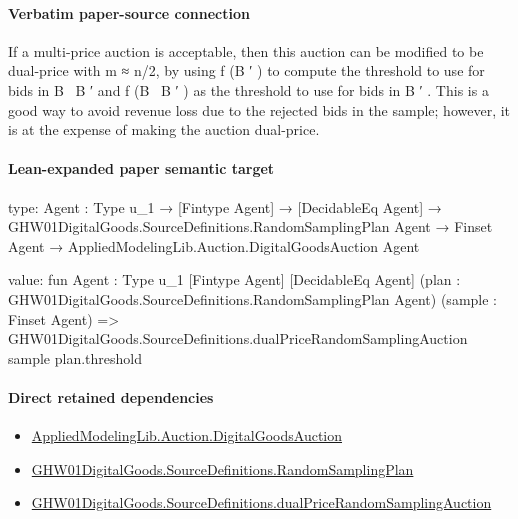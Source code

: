 \documentclass[10pt]{article}
\begin{document}
\paragraph{Verbatim paper-source connection}
\begin{ReviewVerbatim}
If a multi-price auction is acceptable, then this auction can be modified to be dual-price with m ≈ n/2,
by using f (B ′ ) to compute the threshold to use for
bids in B \ B ′ and f (B \ B ′ ) as the threshold to use
for bids in B ′ . This is a good way to avoid revenue
loss due to the rejected bids in the sample; however,
it is at the expense of making the auction dual-price.
\end{ReviewVerbatim}



\paragraph{Lean-expanded paper semantic target}
\begin{ReviewVerbatim}
type:
{Agent : Type u_1} →
  [Fintype Agent] →
    [DecidableEq Agent] →
      GHW01DigitalGoods.SourceDefinitions.RandomSamplingPlan Agent →
        Finset Agent → AppliedModelingLib.Auction.DigitalGoodsAuction Agent

value:
fun {Agent : Type u_1} [Fintype Agent] [DecidableEq Agent]
    (plan : GHW01DigitalGoods.SourceDefinitions.RandomSamplingPlan Agent) (sample : Finset Agent) =>
  GHW01DigitalGoods.SourceDefinitions.dualPriceRandomSamplingAuction sample plan.threshold
\end{ReviewVerbatim}

\paragraph{Direct retained dependencies}
\begin{itemize}\raggedright
\item \hyperlink{governing-declaration-7d5372964da104c4}{Applied\allowbreak{}Modeling\allowbreak{}Lib.\allowbreak{}Auction.\allowbreak{}Digital\allowbreak{}Goods\allowbreak{}Auction}
\item \hyperlink{governing-declaration-6a810a14ccada3a3}{GHW01\allowbreak{}Digital\allowbreak{}Goods.\allowbreak{}Source\allowbreak{}Definitions.\allowbreak{}Random\allowbreak{}Sampling\allowbreak{}Plan}
\item \hyperlink{governing-declaration-e6ce445214e00abd}{GHW01\allowbreak{}Digital\allowbreak{}Goods.\allowbreak{}Source\allowbreak{}Definitions.\allowbreak{}dual\allowbreak{}Price\allowbreak{}Random\allowbreak{}Sampling\allowbreak{}Auction}
\end{itemize}
\end{document}
